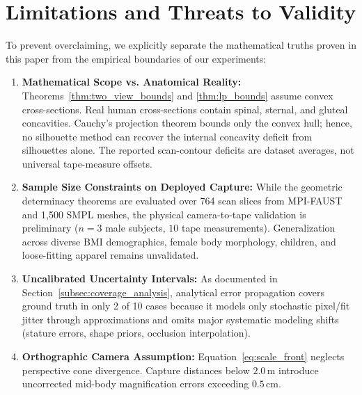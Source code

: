 \documentclass[journal]{IEEEtran}
\begin{document}
\section{Limitations and Threats to Validity}
\label{sec:limitations}
To prevent overclaiming, we explicitly separate the mathematical truths proven in this paper from the empirical boundaries of our experiments:
\begin{enumerate}
    \item \textbf{Mathematical Scope vs. Anatomical Reality:} Theorems~\ref{thm:two_view_bounds} and \ref{thm:lp_bounds} assume convex cross-sections. Real human cross-sections contain spinal, sternal, and gluteal concavities. Cauchy's projection theorem bounds only the convex hull; hence, no silhouette method can recover the internal concavity deficit from silhouettes alone. The reported scan-contour deficits are dataset averages, not universal tape-measure offsets.
    \item \textbf{Sample Size Constraints on Deployed Capture:} While the geometric determinacy theorems are evaluated over 764 scan slices from MPI-FAUST and 1,500 SMPL meshes, the physical camera-to-tape validation is preliminary ($n=3$ male subjects, $10$ tape measurements). Generalization across diverse BMI demographics, female body morphology, children, and loose-fitting apparel remains unvalidated.
    \item \textbf{Uncalibrated Uncertainty Intervals:} As documented in Section~\ref{subsec:coverage_analysis}, analytical error propagation covers ground truth in only 2 of 10 cases because it models only stochastic pixel/fit jitter through approximations and omits major systematic modeling shifts (stature errors, shape priors, occlusion interpolation).
    \item \textbf{Orthographic Camera Assumption:} Equation~\eqref{eq:scale_front} neglects perspective cone divergence. Capture distances below $2.0$\,m introduce uncorrected mid-body magnification errors exceeding $0.5$\,cm.
\end{enumerate}

\end{document}
